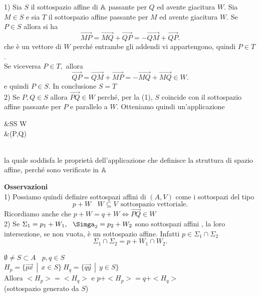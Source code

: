 \documentclass[12px]{article}
\begin{document}
	\begin{dimo}
		1) Sia  $S$ il sottospazio affine di $\mathbb{A}$ passante per $Q$ ed avente giacitura $W$. Sia $M\in S$ e sia $T$ il sottospazio affine passante per $M$ ed avente giacitura $W$. Se $P\in S$ allora si ha
		\[
		 \overrightarrow{MP}=\overrightarrow{MQ}+\overrightarrow{QP} = - \overrightarrow{QM} + \overrightarrow{QP}
		.\] 
		che è un vettore di $W$ perché entrambe gli addendi vi appartengono, quindi $P\in T$.\\
		Se viceversa $P\in T,$ allora
		\[
		\overrightarrow{QP} = \overrightarrow{QM} + \overrightarrow{MP} = - \overrightarrow{MQ} + \overrightarrow{MQ}\in W
		.\] 
		e quindi $P\in S$. In conclusione $S=T$\\
		2) Se $ P,Q\in S$ allora $\overrightarrow{PQ}\in W$ perché, per la (1), $S$ coincide con il sottospazio affine passante per $P$ e parallelo a $W$. Otteniamo quindi un'applicazione\ \ \  \ 
		\begin{aligend}
			\text{   \ \ \ \ \  }&S\times S \rightarrow W\\
			\text{   \ \ \ \   }&(P,Q) \rightarrow {}
		\end{aligend}\\
		la quale soddisfa le proprietà dell'applicazione che definisce la struttura di spazio affine, perché sono verificate in $\mathbb{A}$
	\end{dimo}
	\textbf{Osservazioni}\\
	1) Possiamo quindi definire sottospazi affini di $(A,V)$ come i sottospazi del tipo \[
		p + W \ \ \ \ W\subseteq V \ \ \text{sottospazio vettoriale}
	.\] 
	Ricordiamo anche che $p + W = q + W \Leftrightarrow \overrightarrow{PQ}\in W$ \ \\[10px]2) Se $\Sigma_1 = p_1 + W_1, \ \ \Simga_2 = p_2 + W_2$ sono sottospazi affini , la loro intersezione, se non vuota, è un sottospazio affine. Infatti $p\in\Sigma_1\cap\Sigma_2$ 
	\[
	\Sigma_1\cap\Sigma_2=p + W_1\cap W_2
	.\] 
	\begin{lemm}
		$\emptyset\neq S\subset A \ \ \ \ p,q\in S$\\
		$H_p = \{\overrightarrow{px}\ \ |\ \ x\in S\} \ H_q =\{ \overrightarrow{qy}\ \ |\ \ y\in S\}$\\
		Allora $<H_p> = <H_q>$ e $p + <H_p> = q + <H_q>$ \\(sottospazio generato da $S$)
	\end{lemm}
\end{document}
